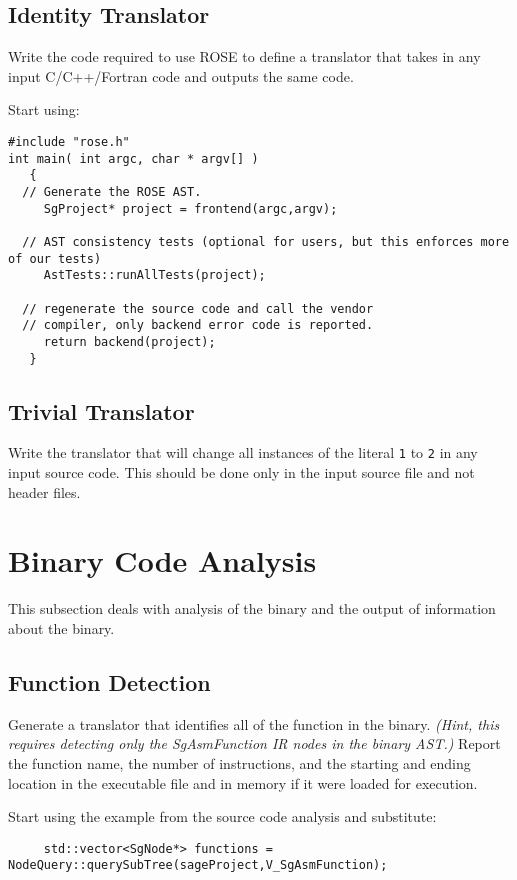 \subsection{Identity Translator}
   Write the code required to use ROSE to define a translator
that takes in any input C/C++/Fortran code and outputs the 
same code.

Start using:
\begin{verbatim}
#include "rose.h"
int main( int argc, char * argv[] )
   {
  // Generate the ROSE AST.
     SgProject* project = frontend(argc,argv);

  // AST consistency tests (optional for users, but this enforces more of our tests)
     AstTests::runAllTests(project);

  // regenerate the source code and call the vendor 
  // compiler, only backend error code is reported.
     return backend(project);
   }
\end{verbatim}

\subsection{Trivial Translator}
   Write the translator that will change all instances of the literal
{\tt 1} to {\tt 2} in any input source code.  This should be done only
in the input source file and not header files.




\section{Binary Code Analysis}
   This subsection deals with analysis of the binary and the
output of information about the binary.

\subsection{Function Detection}
   Generate a translator that identifies all of the function in the binary.
{\em (Hint, this requires detecting only the SgAsmFunction IR nodes in the binary AST.)}
Report the function name, the number of instructions, and the starting and ending location
in the executable file and in memory if it were loaded for execution.

Start using the example from the source code analysis and substitute:
\begin{verbatim}
     std::vector<SgNode*> functions = NodeQuery::querySubTree(sageProject,V_SgAsmFunction);
\end{verbatim}



